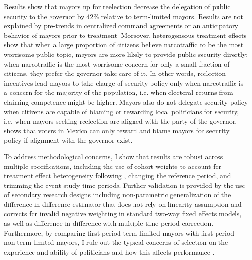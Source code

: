 \documentclass[12pt]{amsart}
\numberwithin{equation}{section}
\theoremstyle{definition}
\theoremstyle{definition}
\theoremstyle{definition}
\begin{document}
Results show that mayors up for reelection decrease the delegation of public security to the governor by 42\% relative to term-limited mayors. Results are not explained by pre-trends in centralized command agreements or an anticipatory behavior of mayors prior to treatment. Moreover, heterogeneous treatment effects show that when a large proportion of citizens believe narcotraffic to be the most worrisome public topic, mayors are more likely to provide public security directly; when narcotraffic is the most worrisome concern for only a small fraction of citizens, they prefer the governor take care of it. In other words, reelection incentives lead mayors to take charge of security policy only when narcotraffic is a concern for the majority of the population, i.e. when electoral returns from claiming competence might be higher. Mayors also do not delegate security policy when citizens are capable of blaming or rewarding local politicians for security, i.e. when mayors seeking reelection are aligned with the party of the governor. \citet{ley_2017} shows that voters in Mexico can only reward and blame mayors for security policy if alignment with the governor exist. 

To address methodological concerns, I show that results are robust across multiple specifications, including the use of cohort weights to account for treatment effect heterogeneity following \citet{abraham_sun_2020}, changing the reference period, and trimming the event study time periods. Further validation is provided by the use of secondary research designs including \citet{imai_etal_2020} non-parametric generalization of the difference-in-difference estimator that does not rely on linearity assumption and corrects for invalid negative weighting in standard two-way fixed effects models, as well as \citet{chaisemarting_etal_2019} difference-in-difference with multiple time period correction. Furthermore, by comparing first period term limited mayors with first period non-term limited mayors, I rule out the typical concerns of selection on the experience and ability of politicians \citep{samuelson_1984, dalbo_etal_2017} and how this affects performance \citep{ferraz_finan_2011}. 
\end{document}
